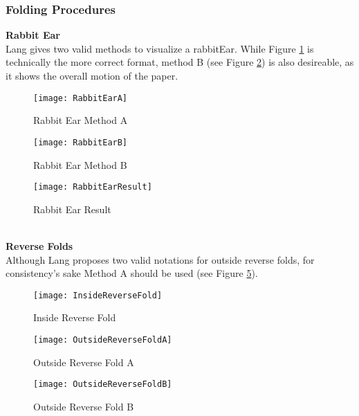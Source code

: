 \newpage
\subsubsection{Folding Procedures}
\textbf{Rabbit Ear}\\
Lang gives two valid methods to visualize a \gls{rabbitEar}. While Figure \ref{fig:rabbitEarA} is technically the more correct format, method B (see Figure \ref{fig:rabbitEarB}) is also desireable, as it shows the overall motion of the paper.
\begin{figure*}[h]
    \centering
    \begin{subfigure}[b]{0.4\textwidth}
        \texttt{[image: RabbitEarA]}
        \caption{Rabbit Ear Method A}
        \label{fig:rabbitEarA}
    \end{subfigure}
    \begin{subfigure}[b]{0.52\textwidth}
        \texttt{[image: RabbitEarB]}
        \caption{Rabbit Ear Method B}
        \label{fig:rabbitEarB}
    \end{subfigure}
    \caption{Both methods show a rabbit ear}
    \label{fig:rabbitEarMethods}
\end{figure*}
\begin{figure}[h]
	\centering
	\texttt{[image: RabbitEarResult]}
	\caption{Rabbit Ear Result}
	\label{fig:rabbitEarResult}
\end{figure}\\
\newpage
\textbf{Reverse Folds}\\
Although Lang proposes two valid notations for outside reverse folds, for consistency's sake Method A should be used (see Figure \ref{fig:outsideReverseFoldA}).

\begin{figure*}[h]
	\centering
	\begin{subfigure}[b]{0.3\textwidth}
		\texttt{[image: InsideReverseFold]}
		\caption{Inside Reverse Fold}
		\label{fig:insideReverseFold}
	\end{subfigure}
	\begin{subfigure}[b]{0.3\textwidth}
		\texttt{[image: OutsideReverseFoldA]}
		\caption{Outside Reverse Fold A}
		\label{fig:outsideReverseFoldA}
	\end{subfigure}
	\begin{subfigure}[b]{0.3\textwidth}
		\texttt{[image: OutsideReverseFoldB]}
		\caption{Outside Reverse Fold B}
		\label{fig:outsideReverseFoldB}
	\end{subfigure}
	\caption{Different reverse folds}
	\label{fig:reverseFoldMethods}
\end{figure*}

